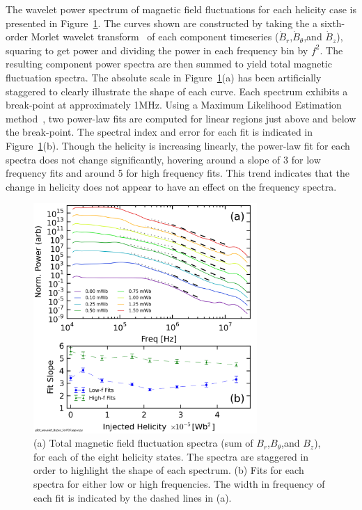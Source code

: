 \documentclass[aps,prl,amsmath,amssymb,reprint,superscriptaddress]{revtex4-1} %
\begin{document}
The wavelet power spectrum of magnetic field fluctuations for each helicity case is presented in Figure~\ref{fig:Btot_spectra}. The curves shown are constructed by taking the a sixth-order Morlet wavelet transform~\cite{torrence98} of each component timeseries ($\dot{B}_r$,$\dot{B}_{\theta}$,and $\dot{B}_{z}$), squaring to get power and dividing the power in each frequency bin by $f^{2}$. The resulting component power spectra are then summed to yield total magnetic fluctuation spectra. The absolute scale in Figure~\ref{fig:Btot_spectra}(a) has been artificially staggered to clearly illustrate the shape of each curve. Each spectrum exhibits a break-point at approximately 1MHz. Using a Maximum Likelihood Estimation method~\cite{clauset09}, two power-law fits are computed for linear regions just above and below the break-point. The spectral index and error for each fit is indicated in Figure~\ref{fig:Btot_spectra}(b). Though the helicity is increasing linearly, the power-law fit for each spectra does not change significantly, hovering around a slope of 3 for low frequency fits and around 5 for high frequency fits. This trend indicates that the change in helicity does not appear to have an effect on the frequency spectra.

\begin{figure}[!htbp]
\centerline{
\includegraphics[width=8.5cm]{Btot_spectra.png}}
\caption{\label{fig:Btot_spectra} (a) Total magnetic field fluctuation spectra (sum of $B_r$,$B_{\theta}$,and $B_{z}$), for each of the eight helicity states. The spectra are staggered in order to highlight the shape of each spectrum. (b) Fits for each spectra for either low or high frequencies. The width in frequency of each fit is indicated by the dashed lines in (a).}
\end{figure}
\end{document}
